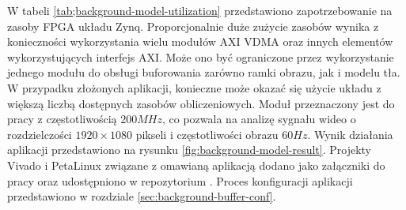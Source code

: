 W tabeli \ref{tab;background-model-utilization} przedstawiono zapotrzebowanie na zasoby FPGA układu Zynq.
Proporcjonalnie duże zużycie zasobów wynika z konieczności wykorzystania wielu modułów AXI VDMA oraz innych elementów wykorzystujących interfejs AXI. 
Może ono być ograniczone przez wykorzystanie jednego modułu do obsługi buforowania zarówno ramki obrazu, jak i modelu tła. 
W przypadku złożonych aplikacji, konieczne może okazać się użycie układu z większą liczbą dostępnych zasobów obliczeniowych. 
Moduł przeznaczony jest do pracy z częstotliwością $200MHz$, co pozwala na analizę sygnału wideo o rozdzielczości $1920 \times 1080$ pikseli i częstotliwości obrazu $60Hz$.
Wynik działania aplikacji przedstawiono na rysunku \ref{fig:background-model-result}. Projekty Vivado i PetaLinux związane z omawianą aplikacją dodano jako załączniki do pracy oraz udostępniono w repozytorium \cite{git-repository}. Proces konfiguracji aplikacji przedstawiono w rozdziale \ref{sec:background-buffer-conf}.
